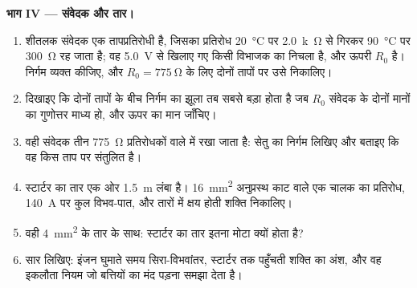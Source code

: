 \begin{problem}
\medskip
\noindent\textbf{भाग IV --- संवेदक और तार।}
\begin{enumerate}[resume]
  \item शीतलक संवेदक एक तापप्रतिरोधी है, जिसका प्रतिरोध
        \qty{20}{\degreeCelsius} पर \qty{2.0}{k\ohm} से गिरकर
        \qty{90}{\degreeCelsius} पर \qty{300}{\ohm} रह जाता है; वह
        \qty{5.0}{V} से खिलाए गए किसी विभाजक का निचला  है, और
        ऊपरी  $R_0$ है। निर्गम  व्यक्त कीजिए, और
        $R_0 = \qty{775}{\ohm}$ के लिए दोनों तापों पर उसे निकालिए।
  \item दिखाइए कि दोनों तापों के बीच निर्गम का झूला तब सबसे बड़ा होता है जब
        $R_0$ संवेदक के दोनों मानों का गुणोत्तर माध्य हो, और ऊपर का मान
        जाँचिए।
  \item वही संवेदक तीन \qty{775}{\ohm} प्रतिरोधकों वाले 
        में रखा जाता है: सेतु का निर्गम लिखिए और बताइए कि वह किस ताप पर
        संतुलित है।
  \item स्टार्टर का तार एक ओर \qty{1.5}{m} लंबा है। \qty{16}{mm^2}
        अनुप्रस्थ काट वाले एक चालक का प्रतिरोध, \qty{140}{A} पर कुल
        विभव-पात, और तारों में क्षय होती शक्ति निकालिए।
  \item वही \qty{4}{mm^2} के तार के साथ: स्टार्टर का तार इतना मोटा क्यों
        होता है?
  \item सार लिखिए: इंजन घुमाते समय सिरा-विभवांतर, स्टार्टर तक पहुँचती शक्ति
        का अंश, और वह इकलौता नियम जो बत्तियों का मंद पड़ना समझा देता है।
\end{enumerate}
\end{problem}
